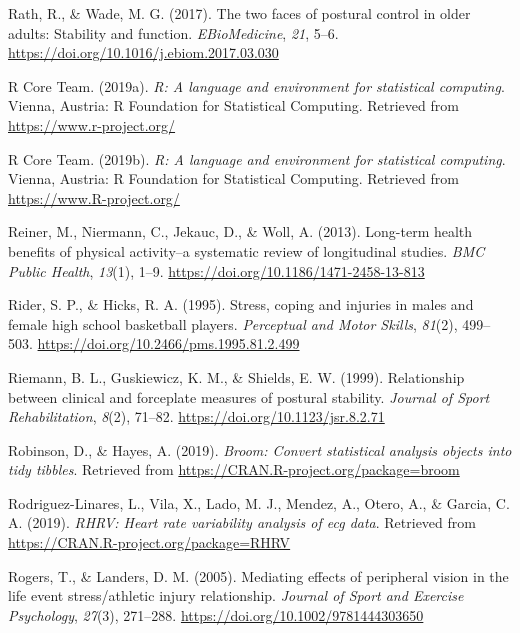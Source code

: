 \documentclass[
  english,
  man,floatsintext]{apa6}
\begin{document}
\leavevmode\hypertarget{ref-Rath2017}{}%
Rath, R., \& Wade, M. G. (2017). The two faces of postural control in older adults: Stability and function. \emph{EBioMedicine}, \emph{21}, 5--6. \url{https://doi.org/10.1016/j.ebiom.2017.03.030}

\leavevmode\hypertarget{ref-RCoreTeam2019}{}%
R Core Team. (2019a). \emph{R: A language and environment for statistical computing}. Vienna, Austria: R Foundation for Statistical Computing. Retrieved from \url{https://www.r-project.org/}

\leavevmode\hypertarget{ref-R-base}{}%
R Core Team. (2019b). \emph{R: A language and environment for statistical computing}. Vienna, Austria: R Foundation for Statistical Computing. Retrieved from \url{https://www.R-project.org/}

\leavevmode\hypertarget{ref-Reiner2013}{}%
Reiner, M., Niermann, C., Jekauc, D., \& Woll, A. (2013). Long-term health benefits of physical activity--a systematic review of longitudinal studies. \emph{BMC Public Health}, \emph{13}(1), 1--9. \url{https://doi.org/10.1186/1471-2458-13-813}

\leavevmode\hypertarget{ref-Rider1995}{}%
Rider, S. P., \& Hicks, R. A. (1995). Stress, coping and injuries in males and female high school basketball players. \emph{Perceptual and Motor Skills}, \emph{81}(2), 499--503. \url{https://doi.org/10.2466/pms.1995.81.2.499}

\leavevmode\hypertarget{ref-Riemann1999d}{}%
Riemann, B. L., Guskiewicz, K. M., \& Shields, E. W. (1999). Relationship between clinical and forceplate measures of postural stability. \emph{Journal of Sport Rehabilitation}, \emph{8}(2), 71--82. \url{https://doi.org/10.1123/jsr.8.2.71}

\leavevmode\hypertarget{ref-R-broom}{}%
Robinson, D., \& Hayes, A. (2019). \emph{Broom: Convert statistical analysis objects into tidy tibbles}. Retrieved from \url{https://CRAN.R-project.org/package=broom}

\leavevmode\hypertarget{ref-Rodriguez-Linares2017}{}%
Rodriguez-Linares, L., Vila, X., Lado, M. J., Mendez, A., Otero, A., \& Garcia, C. A. (2019). \emph{RHRV: Heart rate variability analysis of ecg data}. Retrieved from \url{https://CRAN.R-project.org/package=RHRV}

\leavevmode\hypertarget{ref-Rogers2005}{}%
Rogers, T., \& Landers, D. M. (2005). Mediating effects of peripheral vision in the life event stress/athletic injury relationship. \emph{Journal of Sport and Exercise Psychology}, \emph{27}(3), 271--288. \url{https://doi.org/10.1002/9781444303650}
\end{document}
